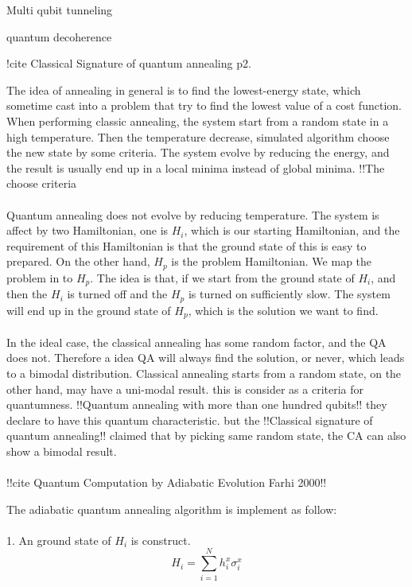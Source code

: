 \documentclass[twoside,a4paper,article]{combine}
\begin{document}
\cite{QABoixo2016} Multi qubit tunneling

\cite{Jin2013} quantum decoherence


!cite Classical Signature of quantum annealing p2.

The idea of annealing in general is to find the lowest-energy state,  which sometime cast into a problem that try to find the lowest value of a cost function. When performing classic annealing, the system start from a random state in a high temperature. Then the temperature decrease, simulated algorithm choose the new state by some criteria. The system evolve by reducing the energy, and the result is usually end up in a local minima instead of global minima. !!The choose criteria\\
\\
Quantum annealing does not evolve by reducing temperature. The system is affect by two Hamiltonian, one is $H_i$, which is our starting Hamiltonian, and the requirement of this Hamiltonian is that the ground state of this is easy to prepared. On the other hand, $H_p$ is the problem Hamiltonian. We map the problem in to $H_p$. The idea is that, if we start from the ground state of $H_i$, and then the $H_i$ is turned off and the $H_p$ is turned on sufficiently slow. The system will end up in the ground state of $H_p$, which is the solution we want to find.\\
\\
In the ideal case, the classical annealing has some random factor, and the QA does not. Therefore a idea QA will always find the solution, or never, which leads to a bimodal distribution. Classical annealing starts from a random state, on the other hand, may have a uni-modal result. this is consider as a criteria for quantumness. !!Quantum annealing with more than one hundred qubits!! they declare to have this quantum characteristic. but the !!Classical signature of quantum annealing!! claimed that by picking same random state, the CA can also show a bimodal result. \\
\\

!!cite Quantum Computation by Adiabatic Evolution Farhi 2000!!

The adiabatic quantum annealing algorithm is implement as follow:\\
\\
1. An ground state of $H_i$ is construct.
\begin{equation*}
	H_i=\sum_{i=1}^{N}h_i^x \sigma_i^x
\end{equation*}   
\end{document}
